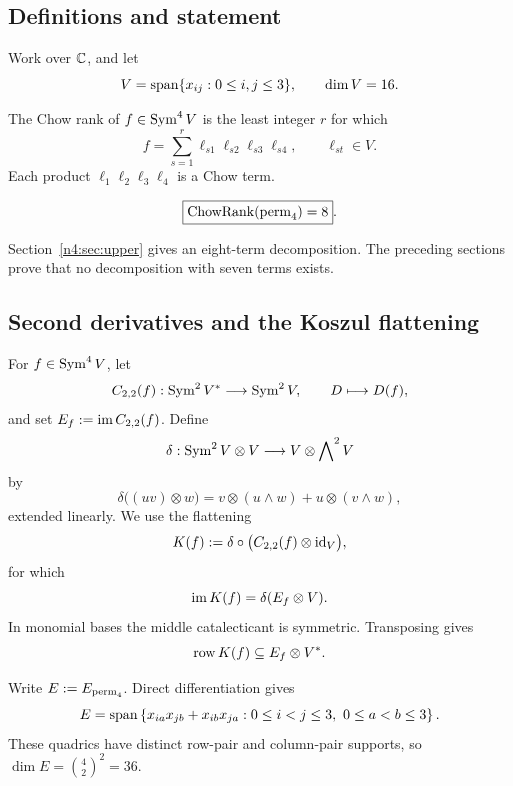 \subsection{Definitions and statement}

Work over \(\mathbb C\), and let
\[
  V=\operatorname{span}\{x_{ij}:0\leq i,j\leq3\},\qquad \dim V=16.
\]

\begin{definition}
The Chow rank of \(f\in\operatorname{Sym}^4V\) is the least integer \(r\) for which
\[
  f=\sum_{s=1}^{r}\ell_{s1}\ell_{s2}\ell_{s3}\ell_{s4},
  \qquad \ell_{st}\in V.
\]
Each product \(\ell_1\ell_2\ell_3\ell_4\) is a Chow term.
\end{definition}

\begin{theorem}\label{n4:thm:main}
\[
  \boxed{\operatorname{ChowRank}(\operatorname{perm}_4)=8}.
\]
\end{theorem}

Section~\ref{n4:sec:upper} gives an eight-term decomposition. The preceding
sections prove that no decomposition with seven terms exists.

\subsection{Second derivatives and the Koszul flattening}
\label{n4:sec:koszul}

For \(f\in\operatorname{Sym}^4V\), let
\[
  C_{2,2}(f):\operatorname{Sym}^2V^*\longrightarrow\operatorname{Sym}^2V,
  \qquad D\longmapsto D(f),
\]
and set \(E_f:=\operatorname{im} C_{2,2}(f)\). Define
\[
  \delta:\operatorname{Sym}^2V\otimes V\longrightarrow V\otimes\bigwedge\nolimits^2V
\]
by
\begin{equation}\label{n4:eq:delta}
  \delta\bigl((uv)\otimes w\bigr)
  =v\otimes(u\wedge w)+u\otimes(v\wedge w),
\end{equation}
extended linearly. We use the flattening
\[
  K(f):=\delta\circ\bigl(C_{2,2}(f)\otimes\operatorname{id}_V\bigr),
\]
for which
\begin{equation}\label{n4:eq:image-k}
  \operatorname{im} K(f)=\delta(E_f\otimes V).
\end{equation}
In monomial bases the middle catalecticant is symmetric. Transposing gives
\begin{equation}\label{n4:eq:row-containment}
  \operatorname{row} K(f)\subseteq E_f\otimes V^*.
\end{equation}

Write \(E:=E_{\operatorname{perm}_4}\). Direct differentiation gives
\begin{equation}\label{n4:eq:E-basis}
  E=\operatorname{span}\left\{
    x_{ia}x_{jb}+x_{ib}x_{ja}:
    0\leq i<j\leq3,\ 0\leq a<b\leq3
  \right\}.
\end{equation}
These quadrics have distinct row-pair and column-pair supports, so
\(\dim E=\binom42^2=36\).


